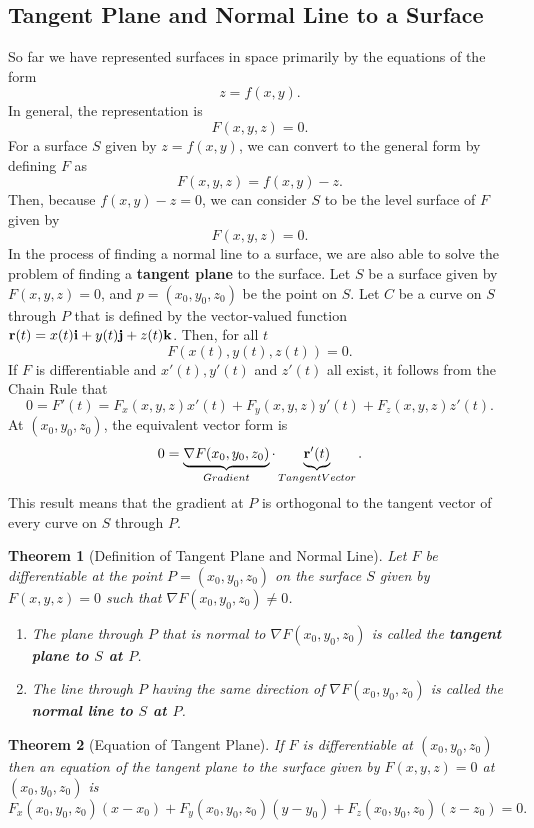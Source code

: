 \documentclass[titlepage,a4paper,12pt]{report}
\newtheorem{theorem}{Theorem}[section]
\begin{document}
\subsection{Tangent Plane and Normal Line to a Surface}
So far we have represented surfaces in space primarily by the equations of the form 
\[z=f(x,y).\] In general, the representation is 
\[F(x,y,z)=0.\] For a surface $S$ given by $z=f(x,y)$, we can convert to the general form by defining $F$ as 
\[F(x,y,z)=f(x,y)-z.\] Then, because $f(x,y)-z=0$, we can consider $S$ to be the level surface of $F$ given by 
\[F(x,y,z)=0.\]
In the process of finding a normal line to a surface, we are also able to solve the problem of finding a \textbf{tangent plane} to the surface. Let $S$ be a surface given by $F(x,y,z)=0$, and $p=(x_0,y_0,z_0)$ be the point on $S$. Let $C$ be a curve on $S$ through $P$ that is defined by the vector-valued function ${\bf{r}}(t)=x(t){\bf{i}}+y(t){\bf{j}}+z(t){\bf{k}}$. Then, for all $t$
\[F(x(t),y(t),z(t))=0.\]
If $F$ is differentiable and $x'(t), y'(t)$ and $z'(t)$ all exist, it follows from the Chain Rule that 
\[0=F'(t)=F_x(x,y,z)x'(t)+F_y(x,y,z)y'(t)+F_z(x,y,z)z'(t).\]
At $(x_0,y_0,z_0)$, the equivalent vector form is 
\[0=\underbrace{\nabla F(x_0,y_0,z_0)}_{Gradient}\cdot \underbrace{{\bf{r}}'(t)}_{Tangent Vector}.\]
This result means that the gradient at $P$ is orthogonal to the tangent vector of every curve on $S$ through $P$.
\begin{theorem}[Definition of Tangent Plane and Normal Line]
Let $F$ be differentiable at the point $P=(x_0,y_0,z_0)$ on the surface $S$ given by $F(x,y,z)=0$ such that $\nabla F(x_0,y_0,z_0)\neq 0$.
\begin{enumerate}
\item The plane through $P$ that is normal to $\nabla F(x_0,y_0,z_0)$ is called the \textbf{tangent plane to $S$ at $P$}.
\item The line through $P$ having the same direction of $\nabla F(x_0,y_0,z_0)$ is called the \textbf{normal line to $S$ at $P$}.
\end{enumerate}
\end{theorem}
\begin{theorem}[Equation of Tangent Plane]
If $F$ is differentiable at $(x_0,y_0,z_0)$ then an equation of the tangent plane to the surface given by $F(x,y,z)=0$ at $(x_0,y_0,z_0)$ is 
\[F_x(x_0,y_0,z_0)(x-x_0)+F_y(x_0,y_0,z_0)(y-y_0)+F_z(x_0,y_0,z_0)(z-z_0)=0.\]
\end{theorem}
\end{document}
